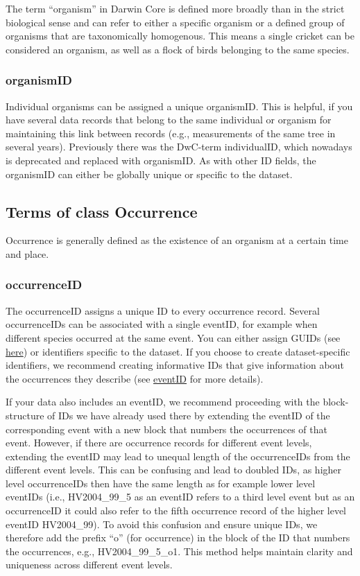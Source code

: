 \documentclass[
  oneside]{book}
\begin{document}
The term ``organism'' in Darwin Core is defined more broadly than in the strict biological sense and can refer to either a specific organism or a defined group of organisms that are taxonomically homogenous. This means a single cricket can be considered an organism, as well as a flock of birds belonging to the same species.

\subsubsection{organismID}\label{organismid}

Individual organisms can be assigned a unique organismID. This is helpful, if you have several data records that belong to the same individual or organism for maintaining this link between records (e.g., measurements of the same tree in several years). Previously there was the DwC-term individualID, which nowadays is deprecated and replaced with organismID. As with other ID fields, the organismID can either be globally unique or specific to the dataset.

\subsection{Terms of class Occurrence}\label{terms-of-class-occurrence}

Occurrence is generally defined as the existence of an organism at a certain time and place.

\subsubsection{occurrenceID}\label{occurrenceID}

The occurrenceID assigns a unique ID to every occurrence record. Several occurrenceIDs can be associated with a single eventID, for example when different species occurred at the same event. You can either assign GUIDs (see \hyperref[GUIDcreation]{here}) or identifiers specific to the dataset. If you choose to create dataset-specific identifiers, we recommend creating informative IDs that give information about the occurrences they describe (see \hyperref[eventID]{eventID} for more details).

If your data also includes an eventID, we recommend proceeding with the block-structure of IDs we have already used there by extending the eventID of the corresponding event with a new block that numbers the occurrences of that event. However, if there are occurrence records for different event levels, extending the eventID may lead to unequal length of the occurrenceIDs from the different event levels. This can be confusing and lead to doubled IDs, as higher level occurrenceIDs then have the same length as for example lower level eventIDs (i.e., HV2004\_99\_5 as an eventID refers to a third level event but as an occurrenceID it could also refer to the fifth occurrence record of the higher level eventID HV2004\_99). To avoid this confusion and ensure unique IDs, we therefore add the prefix ``o'' (for occurrence) in the block of the ID that numbers the occurrences, e.g., HV2004\_99\_5\_o1. This method helps maintain clarity and uniqueness across different event levels.
\end{document}
